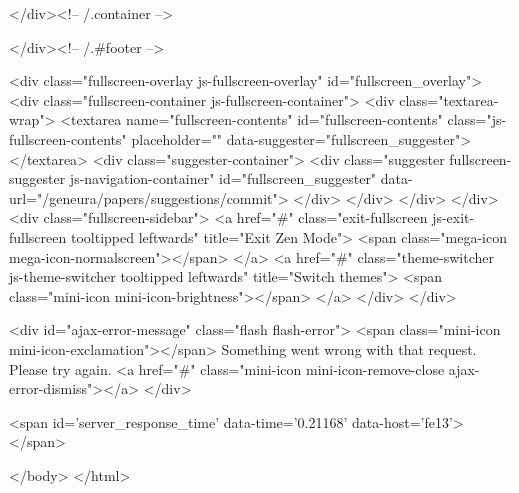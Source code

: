   </div><!-- /.container -->

</div><!-- /.#footer -->


    <div class="fullscreen-overlay js-fullscreen-overlay" id="fullscreen_overlay">
  <div class="fullscreen-container js-fullscreen-container">
    <div class="textarea-wrap">
      <textarea name="fullscreen-contents" id="fullscreen-contents" class="js-fullscreen-contents" placeholder="" data-suggester="fullscreen_suggester"></textarea>
          <div class="suggester-container">
              <div class="suggester fullscreen-suggester js-navigation-container" id="fullscreen_suggester"
                 data-url="/geneura/papers/suggestions/commit">
              </div>
          </div>
    </div>
  </div>
  <div class="fullscreen-sidebar">
    <a href="#" class="exit-fullscreen js-exit-fullscreen tooltipped leftwards" title="Exit Zen Mode">
      <span class="mega-icon mega-icon-normalscreen"></span>
    </a>
    <a href="#" class="theme-switcher js-theme-switcher tooltipped leftwards"
      title="Switch themes">
      <span class="mini-icon mini-icon-brightness"></span>
    </a>
  </div>
</div>



    <div id="ajax-error-message" class="flash flash-error">
      <span class="mini-icon mini-icon-exclamation"></span>
      Something went wrong with that request. Please try again.
      <a href="#" class="mini-icon mini-icon-remove-close ajax-error-dismiss"></a>
    </div>

    
    
    <span id='server_response_time' data-time='0.21168' data-host='fe13'></span>
    
  </body>
</html>

